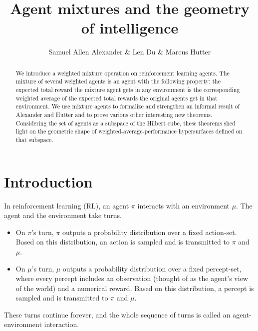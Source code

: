 \documentclass[twoside]{article}
\begin{document}

 \title{Agent mixtures and the geometry of intelligence}
\author{Samuel Allen Alexander \& Len Du \& Marcus Hutter}


\maketitle

\begin{abstract}
    We introduce a weighted mixture operation on
    reinforcement learning agents. The mixture of several weighted agents is
    an agent with the
    following property: the expected total reward the mixture agent
    gets in any environment is the corresponding weighted average
    of the expected total rewards the original agents get in that
    environment. We use mixture agents to formalize and
    strengthen an informal result of Alexander and Hutter and to prove
    various other interesting new theorems. Considering the set of agents
    as a subspace of the Hilbert cube, these theorems shed
    light on the geometric shape of weighted-average-performance
    hypersurfaces defined on that subspace.
\end{abstract}

\section{Introduction}

In reinforcement learning (RL), an agent $\pi$ interacts with an environment $\mu$.
The agent and the environment take turns.
\begin{itemize}
\item
On $\pi$'s turn, $\pi$
outputs a probability distribution over a fixed action-set.
Based on this distribution, an action is sampled
and is transmitted to $\pi$ and $\mu$.
\item
On $\mu$'s turn, $\mu$
outputs a probability distribution over a fixed percept-set,
where every percept includes an observation (thought of as
the agent's view of the world) and a numerical reward.
Based on this distribution, a percept is sampled and
is transmitted to $\pi$ and $\mu$.
\end{itemize}
These turns continue forever, and the whole sequence of turns
is called an agent-environment interaction.
\end{document}
